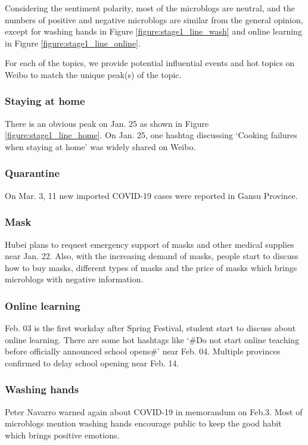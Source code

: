 \documentclass[sigconf, nonacm=true]{acmart}
\begin{document}
Considering the sentiment polarity, most of the microblogs are neutral, and the numbers of  positive and negative microblogs are similar from the general opinion,  except for washing hands in Figure \ref{figure:stage1_line_wash} and online learning in Figure \ref{figure:stage1_line_online}.

For each of the  topics, we provide potential influential events and hot topics on Weibo to match the unique peak(s) of the topic.
\vspace{-0.2cm}
\subsubsection{Staying at home}
There is an obvious peak on Jan. 25 as shown in Figure \ref{figure:stage1_line_home}. On Jan. 25, one hashtag discussing `Cooking failures when staying at home' was widely shared on Weibo.
\vspace{-0.2cm}
\subsubsection{Quarantine}
On Mar. 3, 11 new imported COVID-19 cases were reported in Gansu Province.
\vspace{-0.2cm}
\subsubsection{Mask}
Hubei plans to request emergency support of masks and other medical supplies near Jan. 22.
Also, with the increasing demand of masks, people start to discuss how to buy masks, different types of masks and the price of masks which brings microblogs with negative information.
\vspace{-0.2cm}
\subsubsection{Online learning}
Feb. 03 is the first workday after Spring Festival, student start to discuss about online learning.
There are some hot hashtags like `\#Do not start online teaching before officially announced school opens\#' near Feb. 04.
Multiple provinces confirmed to delay school opening near Feb. 14.
\vspace{-0.2cm}
\subsubsection{Washing hands}
Peter Navarro warned again about COVID-19 in memorandum on Feb.3.
Most of microblogs mention washing hands encourage public to keep the good habit which brings positive emotions.
\vspace{-0.2cm}
\end{document}
